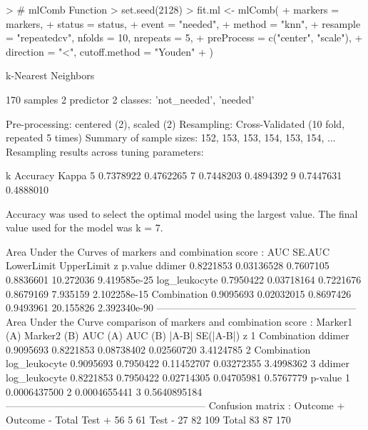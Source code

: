 \documentclass[10pt]{article}
\begin{document}
\begin{Schunk}
\begin{Sinput}
> # mlComb Function
> set.seed(2128)
> fit.ml <- mlComb(
+   markers = markers,
+   status = status,
+   event = "needed",
+   method = "knn",
+   resample = "repeatedcv", nfolds = 10, nrepeats = 5,
+   preProcess = c("center", "scale"),
+   direction = "<", cutoff.method = "Youden"
+ )
\end{Sinput}
\begin{Soutput}
k-Nearest Neighbors 

170 samples
  2 predictor
  2 classes: 'not_needed', 'needed' 

Pre-processing: centered (2), scaled (2) 
Resampling: Cross-Validated (10 fold, repeated 5 times) 
Summary of sample sizes: 152, 153, 153, 154, 153, 154, ... 
Resampling results across tuning parameters:

  k  Accuracy   Kappa    
  5  0.7378922  0.4762265
  7  0.7448203  0.4894392
  9  0.7447631  0.4888010

Accuracy was used to select the optimal model using the largest value.
The final value used for the model was k = 7.


Area Under the Curves of markers and combination score :  
                    AUC     SE.AUC LowerLimit UpperLimit         z      p.value
ddimer        0.8221853 0.03136528  0.7607105  0.8836601 10.272036 9.419585e-25
log_leukocyte 0.7950422 0.03718164  0.7221676  0.8679169  7.935159 2.102258e-15
Combination   0.9095693 0.02032015  0.8697426  0.9493961 20.155826 2.392340e-90
------------------------------------------------------------ 
Area Under the Curve comparison of markers and combination score :  
  Marker1 (A)   Marker2 (B)   AUC (A)   AUC (B)      |A-B|  SE(|A-B|)         z
1 Combination        ddimer 0.9095693 0.8221853 0.08738402 0.02560720 3.4124785
2 Combination log_leukocyte 0.9095693 0.7950422 0.11452707 0.03272355 3.4998362
3      ddimer log_leukocyte 0.8221853 0.7950422 0.02714305 0.04705981 0.5767779
       p-value
1 0.0006437500
2 0.0004655441
3 0.5640895184
------------------------------------------------------------ 
Confusion matrix :  
          Outcome +    Outcome -      Total
Test +           56            5         61
Test -           27           82        109
Total            83           87        170


\end{Soutput}
\end{Schunk}
\end{document}
